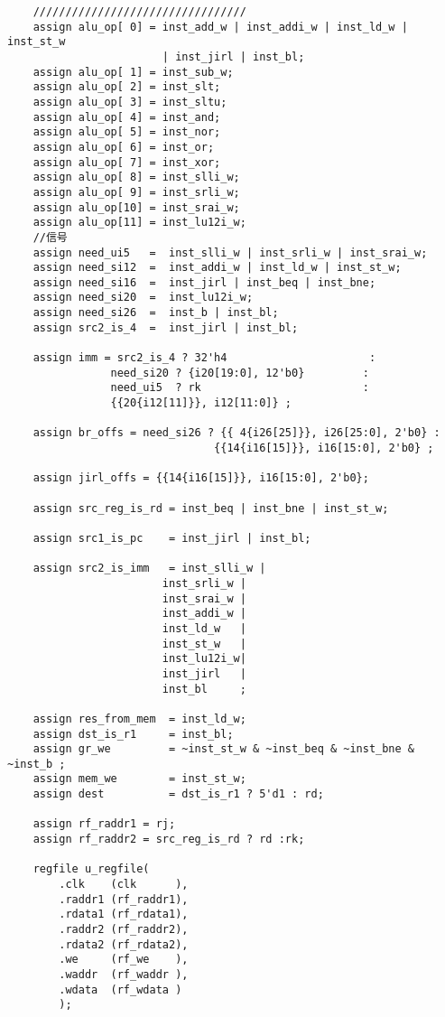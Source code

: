 \begin{lstlisting}
    /////////////////////////////////
    assign alu_op[ 0] = inst_add_w | inst_addi_w | inst_ld_w | inst_st_w
                        | inst_jirl | inst_bl;
    assign alu_op[ 1] = inst_sub_w;
    assign alu_op[ 2] = inst_slt;
    assign alu_op[ 3] = inst_sltu;
    assign alu_op[ 4] = inst_and;
    assign alu_op[ 5] = inst_nor;
    assign alu_op[ 6] = inst_or;
    assign alu_op[ 7] = inst_xor;
    assign alu_op[ 8] = inst_slli_w;
    assign alu_op[ 9] = inst_srli_w;
    assign alu_op[10] = inst_srai_w;
    assign alu_op[11] = inst_lu12i_w;
    //信号
    assign need_ui5   =  inst_slli_w | inst_srli_w | inst_srai_w;
    assign need_si12  =  inst_addi_w | inst_ld_w | inst_st_w;
    assign need_si16  =  inst_jirl | inst_beq | inst_bne;
    assign need_si20  =  inst_lu12i_w;
    assign need_si26  =  inst_b | inst_bl;
    assign src2_is_4  =  inst_jirl | inst_bl;

    assign imm = src2_is_4 ? 32'h4                      :
                need_si20 ? {i20[19:0], 12'b0}         :
                need_ui5  ? rk                         :
                {{20{i12[11]}}, i12[11:0]} ;

    assign br_offs = need_si26 ? {{ 4{i26[25]}}, i26[25:0], 2'b0} :
                                {{14{i16[15]}}, i16[15:0], 2'b0} ;

    assign jirl_offs = {{14{i16[15]}}, i16[15:0], 2'b0};

    assign src_reg_is_rd = inst_beq | inst_bne | inst_st_w;

    assign src1_is_pc    = inst_jirl | inst_bl;

    assign src2_is_imm   = inst_slli_w |
                        inst_srli_w |
                        inst_srai_w |
                        inst_addi_w |
                        inst_ld_w   |
                        inst_st_w   |
                        inst_lu12i_w|
                        inst_jirl   |
                        inst_bl     ;

    assign res_from_mem  = inst_ld_w;
    assign dst_is_r1     = inst_bl;
    assign gr_we         = ~inst_st_w & ~inst_beq & ~inst_bne & ~inst_b ;
    assign mem_we        = inst_st_w;
    assign dest          = dst_is_r1 ? 5'd1 : rd;

    assign rf_raddr1 = rj;
    assign rf_raddr2 = src_reg_is_rd ? rd :rk;

    regfile u_regfile(
        .clk    (clk      ),
        .raddr1 (rf_raddr1),
        .rdata1 (rf_rdata1),
        .raddr2 (rf_raddr2),
        .rdata2 (rf_rdata2),
        .we     (rf_we    ),
        .waddr  (rf_waddr ),
        .wdata  (rf_wdata )
        );
        

\end{lstlisting}
